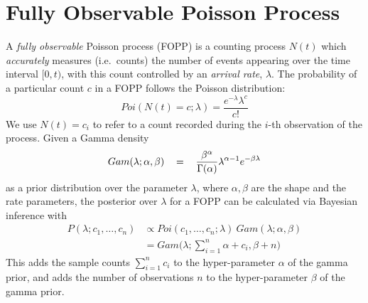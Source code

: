 
\section{Fully Observable Poisson Process}
\label{sec:preliminaries}

A \emph{fully observable} Poisson process (FOPP) is a counting process $N(t)$ which \emph{accurately} measures (i.e.~counts) the number of events appearing over the time interval $[0, t)$, with this count controlled by an \textit{arrival rate}, $\lambda$. The probability of a particular count $c$ in a FOPP follows the Poisson distribution:
\begin{equation}
    \label{eq:pmf_poisson}
	Poi(N(t) = c ; \lambda) = \frac{e ^{-\lambda} \lambda ^{c}}{c!}
\end{equation}
We use $N(t) = c_i$ to refer to a count recorded during the $i$-th observation of the process.
Given a Gamma density
\begin{equation}
    \label{eq:pdf_gamma}
    \begin{tabular}{rcl}
        $Gam(\lambda ; \alpha, \beta)$ & = & $\displaystyle\frac{\beta ^{\alpha}}{\Gamma (\alpha)} \lambda ^{\alpha - 1} e^{-\beta \lambda}$ \\ [1ex]
    \end{tabular}
\end{equation}
as a prior distribution over the parameter $\lambda$, where $\alpha, \beta$ are the shape and the rate parameters, the posterior over $\lambda$ for a FOPP can be  calculated via Bayesian inference with
\begin{equation}
    \label{eq:posterior_fopp}
    \begin{array}{lll}
        P(\lambda ; c_1, \ldots, c_n) & \varpropto Poi(c_1, \ldots, c_n ; \lambda) ~ Gam(\lambda ; \alpha, \beta) \\
         & = Gam \Bigg(\lambda ; \displaystyle\sum_{i=1}^{n} \alpha + c_i, \beta + n \Bigg)
    \end{array}
\end{equation}
This adds the sample counts $\sum_{i=1}^{n} c_i$ to the hyper-parameter $\alpha$ of the gamma prior, and adds the number of observations $n$ to the hyper-parameter $\beta$ of the gamma prior.
